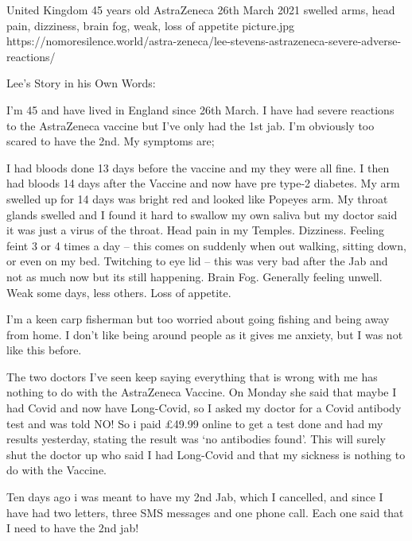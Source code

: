 {United Kingdom}
{45 years old}
{AstraZeneca}
{26th March 2021}
{swelled arms, head pain, dizziness, brain fog, weak, loss of appetite}
{picture.jpg}
{https://nomoresilence.world/astra-zeneca/lee-stevens-astrazeneca-severe-adverse-reactions/}
{

Lee’s Story in his Own Words:

I’m 45 and have lived in England since 26th March. I have had severe reactions
to the AstraZeneca vaccine but I’ve only had the 1st jab. I’m obviously too
scared to have the 2nd. My symptoms are;

I had bloods done 13 days before the vaccine and my they were all fine. I then
had bloods 14 days after the Vaccine and now have pre type-2 diabetes. My arm
swelled up for 14 days was bright red and looked like Popeyes arm.  My throat
glands swelled and I found it hard to swallow my own saliva but my doctor said
it was just a virus of the throat.  Head pain in my Temples.  Dizziness.
Feeling feint 3 or 4 times a day – this comes on suddenly when out walking,
sitting down, or even on my bed.  Twitching to eye lid – this was very bad after
the Jab and not as much now but its still happening.  Brain Fog.  Generally
feeling unwell.  Weak some days, less others.  Loss of appetite.

I’m a keen carp fisherman but too worried about going fishing and being away
from home. I don’t like being around people as it gives me anxiety, but I was
not like this before.

The two doctors I’ve seen keep saying everything that is wrong with me has
nothing to do with the AstraZeneca Vaccine. On Monday she said that maybe I had
Covid and now have Long-Covid, so I asked my doctor for a Covid antibody test
and was told NO! So i paid £49.99 online to get a test done and had my results
yesterday, stating the result was ‘no antibodies found’. This will surely shut
the doctor up who said I had Long-Covid and that my sickness is nothing to do
with the Vaccine.

Ten days ago i was meant to have my 2nd Jab, which I cancelled, and since I have
had two letters, three SMS messages and one phone call. Each one said that I
need to have the 2nd jab!

}
